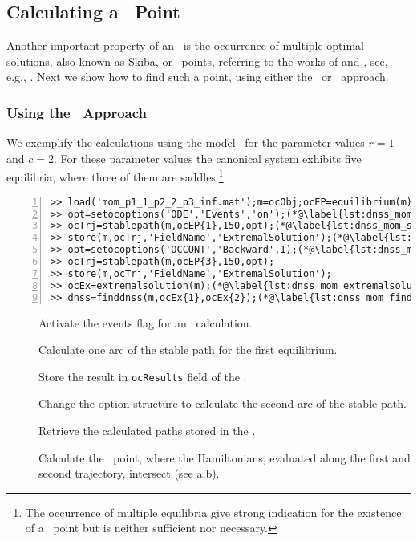 \subsection{Calculating a \DNSP\ Point}
Another important property of an \OCPRO\ is the occurrence of multiple optimal solutions, also known as Skiba, or \DNSP\ points, referring to the works of \citet{sethi1977,sethi1979,skiba1978} and \citet{dechertnishimura1983}, see, e.g., \citet[Chap. 5][]{grassetal2008}. Next we show how to find such a point, using either the \IVP\ or \BVP\ approach.

\subsubsection{Using the \IVP\ Approach}
We exemplify the calculations using the model \MOM\ for the parameter values $r=1$ and $c=2$. For these parameter values the canonical system exhibits five equilibria, where three of them are saddles.\footnote{The occurrence of multiple equilibria give strong indication for the existence of a \DNSP\ point but is neither sufficient nor necessary.}
\begin{lstlisting}[numbers=left]
>> load('mom_p1_1_p2_2_p3_inf.mat');m=ocObj;ocEP=equilibrium(m);
>> opt=setocoptions('ODE','Events','on');(*@\label{lst:dnss_mom_event}@*)
>> ocTrj=stablepath(m,ocEP{1},150,opt);(*@\label{lst:dnss_mom_stablepath}@*)
>> store(m,ocTrj,'FieldName','ExtremalSolution');(*@\label{lst:dnss_mom_store}@*)
>> opt=setocoptions('OCCONT','Backward',1);(*@\label{lst:dnss_mom_backward}@*)
>> ocTrj=stablepath(m,ocEP{3},150,opt);
>> store(m,ocTrj,'FieldName','ExtremalSolution');
>> ocEx=extremalsolution(m);(*@\label{lst:dnss_mom_extremalsolution}@*)
>> dnss=finddnss(m,ocEx{1},ocEx{2});(*@\label{lst:dnss_mom_finddnss}@*)
\end{lstlisting}
\begin{description}
	\item[] Activate the events flag for an \ODE\ calculation.
	\item[] Calculate one arc of the stable path for the first equilibrium.
	\item[] Store the result in \lstinline+ocResults+ field of the \ocmodel.
	\item[] Change the option structure to calculate the second arc of the stable path.
	\item[] Retrieve the calculated paths stored in the \ocmodel.
	\item[] Calculate the \DNSP\ point, where the Hamiltonians, evaluated along the first and second trajectory, intersect (see a,b).
\end{description}
